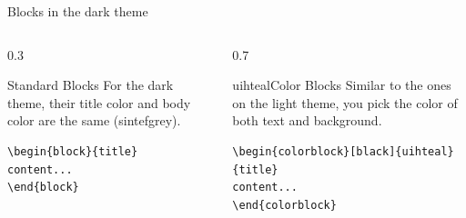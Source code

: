 \documentclass{beamer}
\begin{document}
\begin{frame}[fragile]{Blocks in the dark theme}
\begin{columns}
\begin{column}{0.3\textwidth}
\begin{block}{Standard Blocks}
For the dark theme, their title color and body color are the same (sintefgrey).
\begin{verbatim}
\begin{block}{title}
content...
\end{block}
\end{verbatim}
\end{block}
\end{column}
\begin{column}{0.7\textwidth}
\begin{colorblock}[black]{uihteal}{Color Blocks}
Similar to the ones on the light theme, you pick the color of both text and background.
\small
\begin{verbatim}
\begin{colorblock}[black]{uihteal}{title}
content...
\end{colorblock}
\end{verbatim}
\end{colorblock}
\end{column}
\end{columns}
\end{frame}

\end{document}
